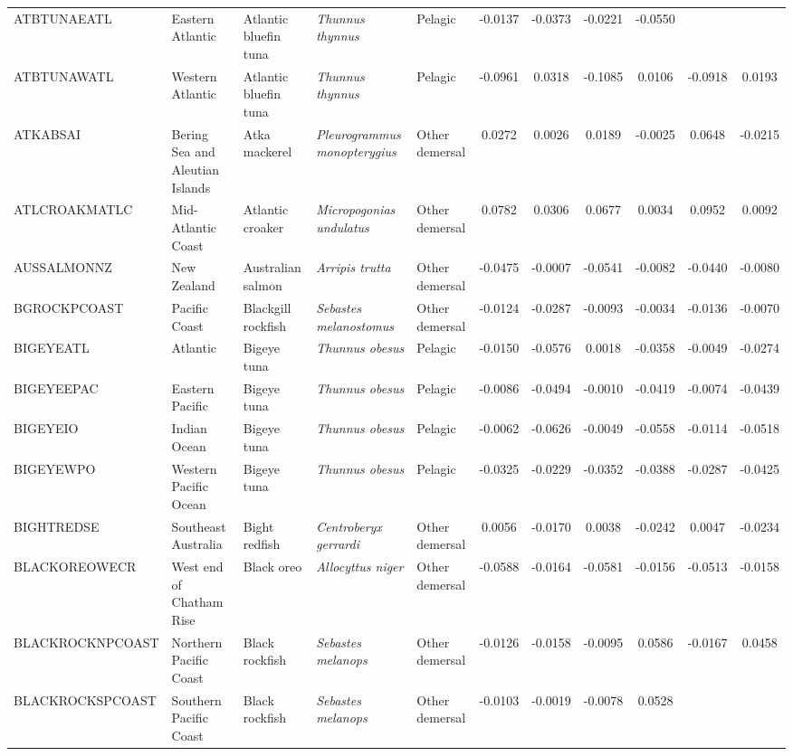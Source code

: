 \begin{longtable}{p{3cm}p{3cm}lllcccccc}
  ATBTUNAEATL & Eastern Atlantic & Atlantic bluefin tuna & \textit{Thunnus thynnus} & Pelagic & -0.0137 & -0.0373 & -0.0221 & -0.0550 &  &  \\
  ATBTUNAWATL & Western Atlantic & Atlantic bluefin tuna & \textit{Thunnus thynnus} & Pelagic & -0.0961 & 0.0318 & -0.1085 & 0.0106 & -0.0918 & 0.0193 \\
  ATKABSAI & Bering Sea and Aleutian Islands & Atka mackerel & \textit{Pleurogrammus monopterygius} & Other demersal & 0.0272 & 0.0026 & 0.0189 & -0.0025 & 0.0648 & -0.0215 \\
  ATLCROAKMATLC & Mid-Atlantic Coast & Atlantic croaker & \textit{Micropogonias undulatus} & Other demersal & 0.0782 & 0.0306 & 0.0677 & 0.0034 & 0.0952 & 0.0092 \\
  AUSSALMONNZ & New Zealand & Australian salmon & \textit{Arripis trutta} & Other demersal & -0.0475 & -0.0007 & -0.0541 & -0.0082 & -0.0440 & -0.0080 \\
  BGROCKPCOAST & Pacific Coast & Blackgill rockfish & \textit{Sebastes melanostomus} & Other demersal & -0.0124 & -0.0287 & -0.0093 & -0.0034 & -0.0136 & -0.0070 \\
  BIGEYEATL & Atlantic & Bigeye tuna & \textit{Thunnus obesus} & Pelagic & -0.0150 & -0.0576 & 0.0018 & -0.0358 & -0.0049 & -0.0274 \\
  BIGEYEEPAC & Eastern Pacific & Bigeye tuna & \textit{Thunnus obesus} & Pelagic & -0.0086 & -0.0494 & -0.0010 & -0.0419 & -0.0074 & -0.0439 \\
  BIGEYEIO & Indian Ocean & Bigeye tuna & \textit{Thunnus obesus} & Pelagic & -0.0062 & -0.0626 & -0.0049 & -0.0558 & -0.0114 & -0.0518 \\
  BIGEYEWPO & Western Pacific Ocean & Bigeye tuna & \textit{Thunnus obesus} & Pelagic & -0.0325 & -0.0229 & -0.0352 & -0.0388 & -0.0287 & -0.0425 \\
  BIGHTREDSE & Southeast Australia & Bight redfish & \textit{Centroberyx gerrardi} & Other demersal & 0.0056 & -0.0170 & 0.0038 & -0.0242 & 0.0047 & -0.0234 \\
  BLACKOREOWECR & West end of Chatham Rise & Black oreo & \textit{Allocyttus niger} & Other demersal & -0.0588 & -0.0164 & -0.0581 & -0.0156 & -0.0513 & -0.0158 \\
  BLACKROCKNPCOAST & Northern Pacific Coast & Black rockfish & \textit{Sebastes melanops} & Other demersal & -0.0126 & -0.0158 & -0.0095 & 0.0586 & -0.0167 & 0.0458 \\
  BLACKROCKSPCOAST & Southern Pacific Coast & Black rockfish & \textit{Sebastes melanops} & Other demersal & -0.0103 & -0.0019 & -0.0078 & 0.0528 &  &  \\

\end{longtable}
